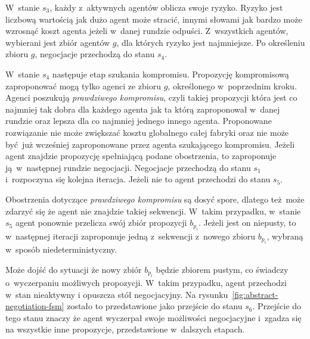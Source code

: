 W~stanie $s_{3}$, każdy z~aktywnych agentów oblicza swoje ryzyko. Ryzyko jest liczbową wartością jak dużo agent może stracić, innymi słowami jak bardzo może wzrosnąć koszt agenta jeżeli w~danej rundzie odpuści. Z~wszystkich agentów, wybierani jest zbiór agentów $g$, dla których ryzyko jest najmniejsze. Po określeniu zbioru $g$, negocjacje przechodzą do stanu $s_{4}$.

W~stanie $s_{4}$ następuje etap szukania kompromisu. Propozycję kompromisową zaproponować mogą tylko agenci ze zbioru $g$, określonego w~poprzednim kroku. Agenci poszukują \emph{prawdziwego kompromisu}, czyli takiej propozycji która jest co najmniej tak dobra dla każdego agenta jak ta którą zaproponował w~danej rundzie oraz lepsza dla co najmniej jednego innego agenta. Proponowane rozwiązanie nie może zwiększać kosztu globalnego całej fabryki oraz nie może być już wcześniej zaproponowane przez agenta szukającego kompromisu. Jeżeli agent znajdzie propozycję spełniającą podane obostrzenia, to zaproponuje ją w~następnej rundzie negocjacji. Negocjacje przechodzą do stanu $s_{1}$ i~rozpoczyna się kolejna iteracja. Jeżeli nie to agent przechodzi do stanu $s_{5}$.

Obostrzenia dotyczące \emph{prawdziwego kompromisu} są dosyć spore, dlatego też może zdarzyć się że agent nie znajdzie takiej sekwencji. W~takim przypadku, w~stanie $s_{5}$ agent ponownie przelicza swój zbiór propozycji $b_{p_{i}}$. Jeżeli jest on niepusty, to w~następnej iteracji zaproponuje jedną z~sekwencji z~nowego zbioru $b_{p_{i}}$, wybraną w~sposób niedeterministyczny.

Może dojść do sytuacji że nowy zbiór $b_{p_{i}}$ będzie zbiorem pustym, co świadczy o~wyczerpaniu możliwych propozycji. W~takim przypadku, agent przechodzi w~stan nieaktywny i opuszcza stół negocjacyjny. Na rysunku~\ref{fig:abstract-negotiation-fsm} zostało to przedstawione jako przejście do stanu $s_{6}$. Przejście do tego stanu znaczy że agent wyczerpał swoje możliwości negocjacyjne i~zgadza się na wszystkie inne propozycje, przedstawione w~dalszych etapach.
